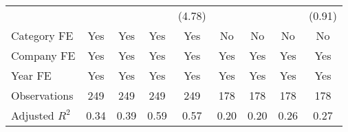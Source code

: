 {\begin{tabular}{l*{8}{c}}
                                   &                     &                     &                     &      (4.78)         &                     &                     &                     &      (0.91)         \\
[1em]
Category FE                        &         Yes         &         Yes         &         Yes         &         Yes         &          No         &          No         &          No         &          No         \\
[1em]
Company FE                         &         Yes         &         Yes         &         Yes         &         Yes         &         Yes         &         Yes         &         Yes         &         Yes         \\
[1em]
Year FE                            &         Yes         &         Yes         &         Yes         &         Yes         &         Yes         &         Yes         &         Yes         &         Yes         \\
\hline
Observations                       &         249         &         249         &         249         &         249         &         178         &         178         &         178         &         178         \\
Adjusted \(R^{2}\)                 &        0.34         &        0.39         &        0.59         &        0.57         &        0.20         &        0.20         &        0.26         &        0.27         \\
\hline\hline
\end{tabular}
}
